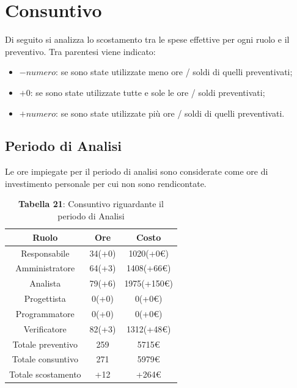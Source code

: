 \section{Consuntivo}
Di seguito si analizza lo scostamento tra le spese effettive per ogni ruolo e il preventivo. Tra parentesi viene indicato:
\begin{itemize}
	\item $-numero$: se sono state utilizzate meno ore / soldi di quelli preventivati;
	\item $+0$: se sono state utilizzate tutte e sole le ore / soldi preventivati;
	\item $+numero$: se sono state utilizzate più ore / soldi di quelli preventivati.
\end{itemize}
\subsection{Periodo di Analisi}
Le ore impiegate per il periodo di analisi sono considerate come ore di investimento personale per cui non sono rendicontate.
\begin{table}[H]
	\centering
	\renewcommand{\arraystretch}{1.5}
	\begin{tabular}{|c|c|c|}
		\hline
		\rowcolor{lighter-grayer}
Ruolo & Ore & Costo \\ \hline
Responsabile & 34(+0) & 1020(+0\euro) \\ \hline
Amministratore & 64(+3) & 1408(+66\euro) \\ \hline
Analista & 79(+6) & 1975(+150\euro) \\ \hline
Progettista & 0(+0) & 0(+0\euro) \\ \hline
Programmatore & 0(+0) & 0(+0\euro) \\ \hline
Verificatore & 82(+3) & 1312(+48\euro) \\ \hline
Totale preventivo & 259 & 5715\euro \\ \hline
Totale consuntivo & 271 & 5979\euro \\ \hline
Totale scostamento & +12 & +264\euro \\ \hline
	\end{tabular}
	\caption*{\textbf{Tabella 21}: Consuntivo riguardante il periodo di Analisi\\}
\end{table}
